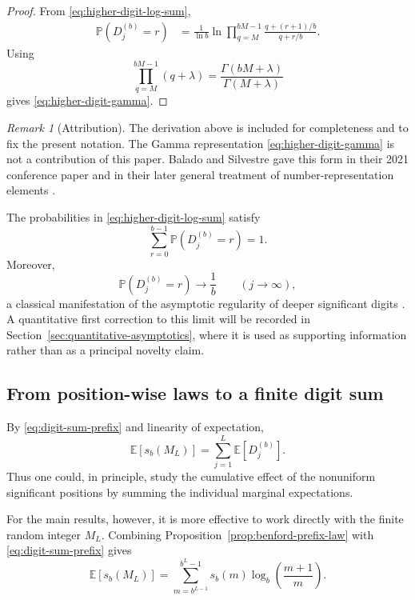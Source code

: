 \documentclass[11pt]{article}
\theoremstyle{definition}
\theoremstyle{remark}
\newtheorem*{remark}{Remark}
\begin{document}
\begin{proof}
From \eqref{eq:higher-digit-log-sum},
\[
\begin{aligned}
    \mathbb P(D_j^{(b)}=r)
    &=
    \frac{1}{\ln b}
    \ln
    \prod_{q=M}^{bM-1}
    \frac{q+(r+1)/b}{q+r/b}.
\end{aligned}
\]
Using
\[
    \prod_{q=M}^{bM-1}(q+\lambda)
    =
    \frac{\Gamma(bM+\lambda)}
         {\Gamma(M+\lambda)}
\]
gives \eqref{eq:higher-digit-gamma}.
\end{proof}

\begin{remark}[Attribution]
\label{rem:gamma-attribution}
The derivation above is included for completeness and to fix the
present notation.  The Gamma representation
\eqref{eq:higher-digit-gamma} is not a contribution of this paper.
Balado and Silvestre gave this form in their 2021 conference paper and
in their later general treatment of number-representation elements
\cite{BaladoSilvestre2021,BaladoSilvestre2024}.
\end{remark}

The probabilities in
\eqref{eq:higher-digit-log-sum} satisfy
\[
    \sum_{r=0}^{b-1}
    \mathbb P(D_j^{(b)}=r)
    =
    1.
\]
Moreover,
\[
    \mathbb P(D_j^{(b)}=r)
    \longrightarrow
    \frac1b
    \qquad
    (j\to\infty),
\]
a classical manifestation of the asymptotic regularity of deeper
significant digits
\cite{Hill1995Phenomenon,HillSchurger2005,
BaladoSilvestre2024}.
A quantitative first correction to this limit will be recorded in
Section~\ref{sec:quantitative-asymptotics}, where it is used as
supporting information rather than as a principal novelty claim.

\subsection{From position-wise laws to a finite digit sum}
\label{subsec:position-to-sum}

By \eqref{eq:digit-sum-prefix} and linearity of expectation,
\begin{equation}
    \mathbb E[s_b(M_L)]
    =
    \sum_{j=1}^{L}\mathbb E[D_j^{(b)}].
    \label{eq:expectation-sum-positions}
\end{equation}
Thus one could, in principle, study the cumulative effect of the
nonuniform significant positions by summing the individual marginal
expectations.

For the main results, however, it is more effective to work directly
with the finite random integer \(M_L\).  Combining
Proposition~\ref{prop:benford-prefix-law} with
\eqref{eq:digit-sum-prefix} gives
\begin{equation}
    \mathbb E[s_b(M_L)]
    =
    \sum_{m=b^{L-1}}^{b^L-1}
    s_b(m)
    \log_b\!\left(\frac{m+1}{m}\right).
    \label{eq:weighted-digit-sum-start}
\end{equation}
\end{document}
